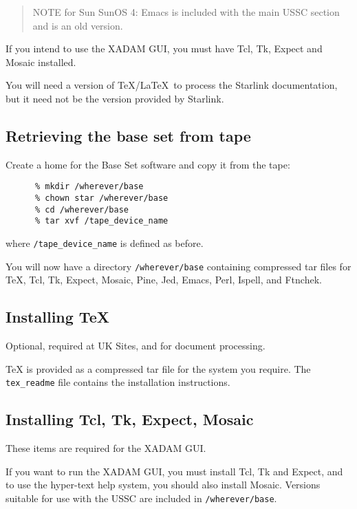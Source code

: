 \begin{quote}
NOTE for Sun SunOS 4: Emacs is included with the main USSC section and is
an old version.
\end{quote}

If you intend to use the XADAM GUI, you must have Tcl, Tk, Expect and Mosaic
installed.

You will need a version of \TeX/\LaTeX\ to process the Starlink documentation,
but it need not be the version provided by Starlink.

\subsection{Retrieving the base set from tape}
\label{s:ibase:tape}

Create a home for the Base Set software and copy it from the tape:

\begin{verbatim}
      % mkdir /wherever/base
      % chown star /wherever/base
      % cd /wherever/base
      % tar xvf /tape_device_name
\end{verbatim}

where \verb+/tape_device_name+ is defined as before.

You will now have a directory {\tt /wherever/base} containing compressed tar
files for \TeX , Tcl, Tk, Expect, Mosaic, Pine, Jed, Emacs, Perl, Ispell,
and Ftnchek.

\subsection{Installing \TeX}
\label{s:ibase:tex}

Optional, required at UK Sites, and for document processing.

TeX is provided as a compressed tar file for the system you require.
The {\tt tex\_readme} file contains the installation instructions.

\subsection{Installing Tcl, Tk, Expect, Mosaic}
\label{s:ibase:tcl}

These items are required for the XADAM GUI.

If you want to run the XADAM GUI, you must install Tcl, Tk and Expect,
and to use the hyper-text help system, you should also install Mosaic.
Versions suitable for use with the USSC are included in
{\tt /wherever/base}.

